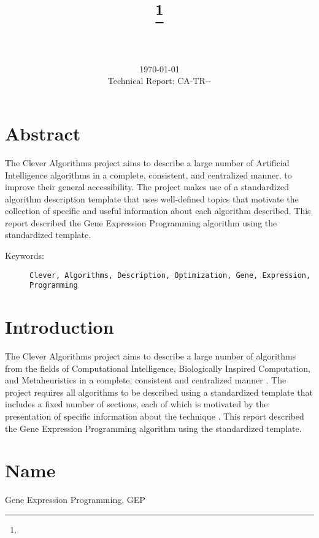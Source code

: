 \documentclass[a4paper, 11pt]{article}
\title{{\myreporttitle}\footnote{\myreportlicense}}
\author{\myreportauthor\\{\myreportemail}\\\small\myreportproject}
\date{\today\\{\small{Technical Report: CA-TR-{\myreportdate}-\myreportversion}}}
\begin{document}
\maketitle

\section*{Abstract} 
The Clever Algorithms project aims to describe a large number of Artificial Intelligence algorithms in a complete, consistent, and centralized manner, to improve their general accessibility. 
The project makes use of a standardized algorithm description template that uses well-defined topics that motivate the collection of specific and useful information about each algorithm described.
This report described the Gene Expression Programming algorithm using the standardized template.

\begin{description}
	\item[Keywords:] {\small\texttt{Clever, Algorithms, Description, Optimization, Gene, Expression, Programming}}
\end{description} 

\section{Introduction} 
\label{sec:intro}
The Clever Algorithms project aims to describe a large number of algorithms from the fields of Computational Intelligence, Biologically Inspired Computation, and Metaheuristics in a complete, consistent and centralized manner \cite{Brownlee2010}.
The project requires all algorithms to be described using a standardized template that includes a fixed number of sections, each of which is motivated by the presentation of specific information about the technique \cite{Brownlee2010a}.
This report described the Gene Expression Programming algorithm using the standardized template.

\section{Name} 
\label{sec:name}
Gene Expression Programming, GEP
\end{document}
